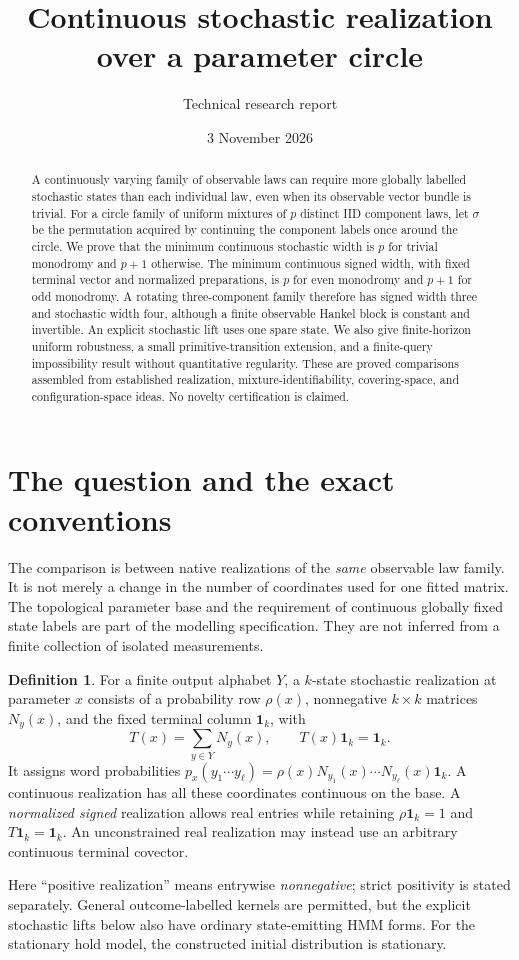 \documentclass[11pt]{article}
\title{Continuous stochastic realization over a parameter circle}
\author{Technical research report}
\date{3 November 2026}
\theoremstyle{definition}\newtheorem{definition}[theorem]{Definition}
\theoremstyle{remark}\newtheorem{remark}[theorem]{Remark}
\newcommand{\one}{\mathbf 1}
\begin{document}
\maketitle
\begin{abstract}
A continuously varying family of observable laws can require more globally labelled stochastic states than each individual law, even when its observable vector bundle is trivial. For a circle family of uniform mixtures of $p$ distinct IID component laws, let $\sigma$ be the permutation acquired by continuing the component labels once around the circle. We prove that the minimum continuous stochastic width is $p$ for trivial monodromy and $p+1$ otherwise. The minimum continuous signed width, with fixed terminal vector and normalized preparations, is $p$ for even monodromy and $p+1$ for odd monodromy. A rotating three-component family therefore has signed width three and stochastic width four, although a finite observable Hankel block is constant and invertible. An explicit stochastic lift uses one spare state. We also give finite-horizon uniform robustness, a small primitive-transition extension, and a finite-query impossibility result without quantitative regularity. These are proved comparisons assembled from established realization, mixture-identifiability, covering-space, and configuration-space ideas. No novelty certification is claimed.
\end{abstract}
\tableofcontents

\section{The question and the exact conventions}
The comparison is between native realizations of the \emph{same} observable law family. It is not merely a change in the number of coordinates used for one fitted matrix. The topological parameter base and the requirement of continuous globally fixed state labels are part of the modelling specification. They are not inferred from a finite collection of isolated measurements.

\begin{definition}
For a finite output alphabet $Y$, a $k$-state stochastic realization at parameter $x$ consists of a probability row $\rho(x)$, nonnegative $k\times k$ matrices $N_y(x)$, and the fixed terminal column $\one_k$, with
\[
 T(x)=\sum_{y\in Y}N_y(x),\qquad T(x)\one_k=\one_k.
\]
It assigns word probabilities $p_x(y_1\cdots y_\ell)=\rho(x)N_{y_1}(x)\cdots N_{y_\ell}(x)\one_k$. A continuous realization has all these coordinates continuous on the base. A \emph{normalized signed} realization allows real entries while retaining $\rho\one_k=1$ and $T\one_k=\one_k$. An unconstrained real realization may instead use an arbitrary continuous terminal covector.
\end{definition}
Here ``positive realization'' means entrywise \emph{nonnegative}; strict positivity is stated separately. General outcome-labelled kernels are permitted, but the explicit stochastic lifts below also have ordinary state-emitting HMM forms. For the stationary hold model, the constructed initial distribution is stationary.
\end{document}
